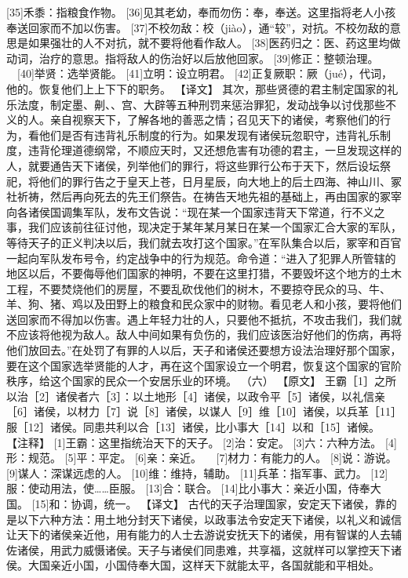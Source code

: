 \documentclass[a4paper,12pt,UTF8,twoside]{ctexbook}
\begin{document}
[35]禾黍：指粮食作物。
[36]见其老幼，奉而勿伤：奉，奉送。这里指将老人小孩奉送回家而不加以伤害。
[37]不校勿敌：校（jiào），通“较”，对抗。不校勿敌的意思是如果强壮的人不对抗，就不要将他看作敌人。
[38]医药归之：医、药这里均做动词，治疗的意思。指将敌人的伤治好以后放他回家。
[39]修正：整顿治理。
　[40]举贤：选举贤能。
[41]立明：设立明君。
[42]正复厥职：厥（jué），代词，他的。恢复他们上上下下的职务。
【译文】
其次，那些贤德的君主制定国家的礼乐法度，制定墨、劓、、宫、大辟等五种刑罚来惩治罪犯，发动战争以讨伐那些不义的人。亲自视察天下，了解各地的善恶之情；召见天下的诸侯，考察他们的行为，看他们是否有违背礼乐制度的行为。如果发现有诸侯玩忽职守，违背礼乐制度，违背伦理道德纲常，不顺应天时，又还想危害有功德的君主，一旦发现这样的人，就要通告天下诸侯，列举他们的罪行，将这些罪行公布于天下，然后设坛祭祀，将他们的罪行告之于皇天上苍，日月星辰，向大地上的后土四海、神山川、冢社祈祷，然后再向死去的先王们祭告。在祷告天地先祖的基础上，再由国家的冢宰向各诸侯国调集军队，发布文告说：“现在某一个国家违背天下常道，行不义之事，我们应该前往征讨他，现决定于某年某月某日在某一个国家汇合大家的军队，等待天子的正义判决以后，我们就去攻打这个国家。”在军队集合以后，冢宰和百官一起向军队发布号令，约定战争中的行为规范。命令道：“进入了犯罪人所管辖的地区以后，不要侮辱他们国家的神明，不要在这里打猎，不要毁坏这个地方的土木工程，不要焚烧他们的房屋，不要乱砍伐他们的树木，不要掠夺民众的马、牛、羊、狗、猪、鸡以及田野上的粮食和民众家中的财物。看见老人和小孩，要将他们送回家而不得加以伤害。遇上年轻力壮的人，只要他不抵抗，不攻击我们，我们就不应该将他视为敌人。敌人中间如果有负伤的，我们应该医治好他们的伤病，再将他们放回去。”在处罚了有罪的人以后，天子和诸侯还要想方设法治理好那个国家，要在这个国家选举贤能的人才，再在这个国家设立一个明君，恢复这个国家的官阶秩序，给这个国家的民众一个安居乐业的环境。
（六）
【原文】
王霸［1］之所以治［2］诸侯者六［3］：以土地形［4］诸侯，以政令平［5］诸侯，以礼信亲［6］诸侯，以材力［7］说［8］诸侯，以谋人［9］维［10］诸侯，以兵革［11］服［12］诸侯。同患共利以合［13］诸侯，比小事大［14］以和［15］诸候。
【注释】
[1]王霸：这里指统治天下的天子。
[2]治：安定。
[3]六：六种方法。
[4]形：规范。
[5]平：平定。
[6]亲：亲近。
　[7]材力：有能力的人。
[8]说：游说。
[9]谋人：深谋远虑的人。
[10]维：维持，辅助。
[11]兵革：指军事、武力。
[12]服：使动用法，使……臣服。
[13]合：联合。
[14]比小事大：亲近小国，侍奉大国。
[15]和：协调，统一。
【译文】
古代的天子治理国家，安定天下诸侯，靠的是以下六种方法：用土地分封天下诸侯，以政事法令安定天下诸侯，以礼义和诚信让天下的诸侯亲近他，用有能力的人士去游说安抚天下的诸侯，用有智谋的人去辅佐诸侯，用武力威慑诸侯。天子与诸侯们同患难，共享福，这就样可以掌控天下诸侯。大国亲近小国，小国侍奉大国，这样天下就能太平，各国就能和平相处。
\end{document}
